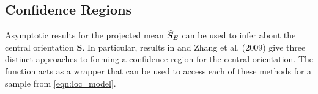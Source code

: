 
%

\subsection{Confidence Regions}

Asymptotic results for the projected mean $\widehat{\bm S}_E$ can be used to infer about the central orientation $\bm S$. In particular, results in \cite{prentice1986,chang2001} and Zhang et al. (2009) give three distinct approaches to forming a confidence region for the central orientation.  The  function acts as a wrapper that can be used to access each of these methods for a sample from \eqref{eqn:loc_model}.


